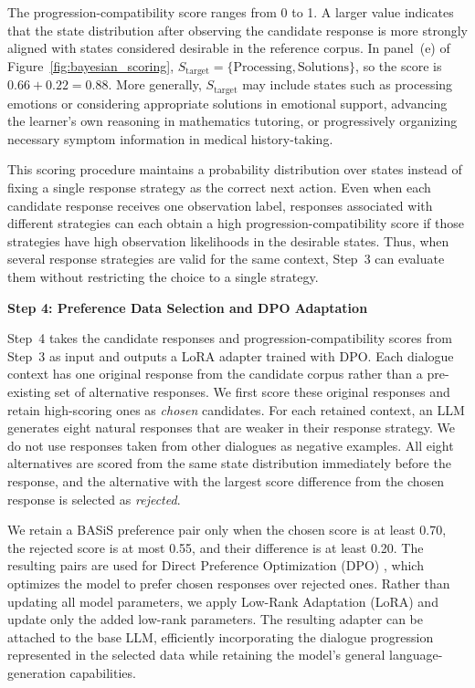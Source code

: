 \documentclass[manuscript,review,anonymous]{acmart}
\begin{document}
The progression-compatibility score ranges from 0 to 1. A larger value indicates that the state distribution after observing the candidate response is more strongly aligned with states considered desirable in the reference corpus. In panel~(e) of Figure~\ref{fig:bayesian_scoring}, $S_{\mathrm{target}}=\{\mathrm{Processing},\mathrm{Solutions}\}$, so the score is $0.66+0.22=0.88$. More generally, $S_{\mathrm{target}}$ may include states such as processing emotions or considering appropriate solutions in emotional support, advancing the learner's own reasoning in mathematics tutoring, or progressively organizing necessary symptom information in medical history-taking.

This scoring procedure maintains a probability distribution over states instead of fixing a single response strategy as the correct next action. Even when each candidate response receives one observation label, responses associated with different strategies can each obtain a high progression-compatibility score if those strategies have high observation likelihoods in the desirable states. Thus, when several response strategies are valid for the same context, Step~3 can evaluate them without restricting the choice to a single strategy.

\label{mod:preference_adaptation}
\noindent\textbf{Step 4: Preference Data Selection and DPO Adaptation}\par

Step~4 takes the candidate responses and progression-compatibility scores from Step~3 as input and outputs a LoRA adapter trained with DPO. Each dialogue context has one original response from the candidate corpus rather than a pre-existing set of alternative responses. We first score these original responses and retain high-scoring ones as \emph{chosen} candidates. For each retained context, an LLM generates eight natural responses that are weaker in their response strategy. We do not use responses taken from other dialogues as negative examples. All eight alternatives are scored from the same state distribution immediately before the response, and the alternative with the largest score difference from the chosen response is selected as \emph{rejected}.

We retain a BASiS preference pair only when the chosen score is at least 0.70, the rejected score is at most 0.55, and their difference is at least 0.20.
The resulting pairs are used for Direct Preference Optimization (DPO) \cite{rafailov2023dpo}, which optimizes the model to prefer chosen responses over rejected ones. Rather than updating all model parameters, we apply Low-Rank Adaptation (LoRA) \cite{hu2021lora} and update only the added low-rank parameters. The resulting adapter can be attached to the base LLM, efficiently incorporating the dialogue progression represented in the selected data while retaining the model's general language-generation capabilities.
\end{document}
